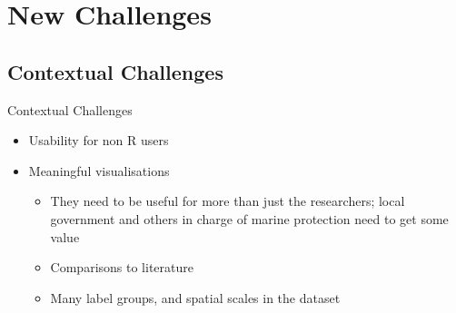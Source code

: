 \documentclass{beamer}
\begin{document}
      \section{New Challenges}
        \subsection{Contextual Challenges}
            \begin{frame}{Contextual Challenges}
                \begin{itemize}
                    \item Usability for non R users
                    \item Meaningful visualisations
                    \begin{itemize}
                       \item They need to be useful for more than just the researchers; local government and others in charge of marine protection need to get some value
                       \item Comparisons to literature
                       \item Many label groups, and spatial scales in the dataset
                    \end{itemize}
                \end{itemize}
              \end{frame}
\end{document}
